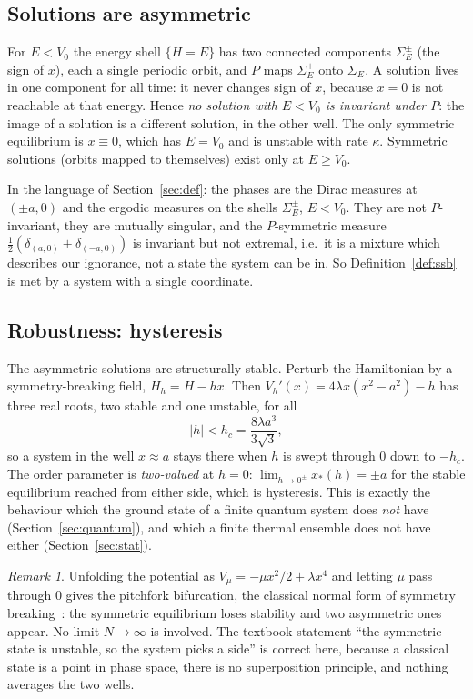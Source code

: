 \documentclass[11pt,a4paper]{article}
\theoremstyle{definition}
\theoremstyle{remark}
\newtheorem*{remark}{Remark}
\begin{document}
\subsection{Solutions are asymmetric}

For $E<V_0$ the energy shell $\{H=E\}$ has two connected components $\Sigma_E^\pm$ (the sign of $x$), each a
single periodic orbit, and $P$ maps $\Sigma^+_E$ onto $\Sigma^-_E$. A solution lives in one component for all
time: it never changes sign of $x$, because $x=0$ is not reachable at that energy. Hence \emph{no solution with
$E<V_0$ is invariant under $P$}: the image of a solution is a different solution, in the other well.
The only symmetric equilibrium is $x\equiv0$, which has $E=V_0$ and is unstable with rate $\kappa$. Symmetric
solutions (orbits mapped to themselves) exist only at $E\ge V_0$.

In the language of Section~\ref{sec:def}: the phases are the Dirac measures at $(\pm a,0)$ and the ergodic
measures on the shells $\Sigma^\pm_E$, $E<V_0$. They are not $P$-invariant, they are mutually singular, and the
$P$-symmetric measure $\tfrac12(\delta_{(a,0)}+\delta_{(-a,0)})$ is invariant but not extremal, i.e.\ it is a
mixture which describes our ignorance, not a state the system can be in. So Definition~\ref{def:ssb} is met by a system with a single coordinate.

\subsection{Robustness: hysteresis}

The asymmetric solutions are structurally stable. Perturb the Hamiltonian by a symmetry-breaking
field, $H_h=H-hx$. Then $V_h'(x)=4\lambda x(x^2-a^2)-h$ has three real roots, two stable and one unstable, for all
\begin{equation}
|h|<h_c=\frac{8\lambda a^3}{3\sqrt3},
\label{eq:hc}
\end{equation}
so a system in the well $x\approx a$ stays there when $h$ is swept through $0$ down to $-h_c$. The
order parameter is \emph{two-valued} at $h=0$: $\lim_{h\to0^\pm}x_*(h)=\pm a$ for the stable equilibrium
reached from either side, which is hysteresis. This is exactly the behaviour which the ground state of a
finite quantum system does \emph{not} have (Section~\ref{sec:quantum}), and which a finite thermal ensemble does not
have either (Section~\ref{sec:stat}).

\begin{remark}
Unfolding the potential as $V_\mu=-\mu x^2/2+\lambda x^4$ and letting $\mu$ pass through $0$ gives the
pitchfork bifurcation, the classical normal form of symmetry breaking~\cite{Golubitsky}: the symmetric
equilibrium loses stability and two asymmetric ones appear. No limit $N\to\infty$ is involved. The textbook
statement ``the symmetric state is unstable, so the system picks a side'' is correct here, because a classical
state is a point in phase space, there is no superposition principle, and nothing averages the two wells.
\end{remark}
\end{document}
